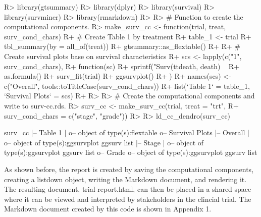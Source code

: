\documentclass[
]{jss}
\begin{document}
\begin{CodeChunk}

\begin{CodeInput}
R> library(gtsummary)
R> library(dplyr)
R> library(survival)
R> library(survminer)
R> library(rmarkdown)
R> 
R> # Function to create the computational components.
R> make_surv_cc <- function(trial, treat, surv_cond_chars) {
R+   # Create Table 1 by treatment
R+   table_1 <- trial %
R+     tbl_summary(by = all_of(treat)) %
R+     gtsummary::as_flextable()
R+ 
R+   # Create survival plots base on survival characteristics
R+   scs <- lapply(c("1", surv_cond_chars),
R+                 function(sc) {
R+                   sprintf("Surv(ttdeath, death) ~ %
R+                     as.formula() %
R+                     surv_fit(trial) %
R+                     ggsurvplot()
R+                 })
R+   names(scs) <- c("Overall", tools::toTitleCase(surv_cond_chars))
R+   list(`Table 1` = table_1, `Survival Plots` = scs)
R+ }
R> 
R> # Create the computational components and write to surv-cc.rds.
R> surv_cc <- make_surv_cc(trial, treat = "trt",
R+                         surv_cond_chars = c("stage", "grade"))
R> 
R> ld_cc_dendro(surv_cc)
\end{CodeInput}

\begin{CodeOutput}

surv_cc
  |-- Table 1
  |  o-- object of type(s):flextable
  o-- Survival Plots
   |-- Overall
   |  o-- object of type(s):ggsurvplot ggsurv list
   |-- Stage
   |  o-- object of type(s):ggsurvplot ggsurv list
   o-- Grade
      o-- object of type(s):ggsurvplot ggsurv list
\end{CodeOutput}
\end{CodeChunk}

As shown before, the report is created by saving the computational
components, creating a listdown object, writing the 
Markdown document, and rendering it. The resulting document,
trial-report.html, can then be placed in a shared space where it can be
viewed and interpreted by stakeholders in the clincial trial. The
 Markdown document created by this code is shown in Appendix
1.
\end{document}
